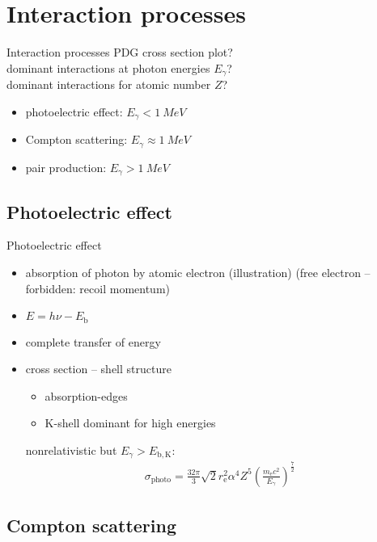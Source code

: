 \documentclass[11pt,xcolor=dvipsnames,professionalfonts]{beamer}
\begin{document}
\section{Interaction processes}

\begin{frame}{Interaction processes}
	PDG cross section plot?\\
	dominant interactions at photon energies $E_\gamma$?\\
	dominant interactions for atomic number $Z$?
	\begin{itemize}
		\item photoelectric effect: $E_\gamma < \SI{1}{MeV}$
		\item Compton scattering: $E_\gamma \approx \SI{1}{MeV}$
		\item pair production: $E_\gamma > \SI{1}{MeV}$
	\end{itemize}
\end{frame}

\subsection{Photoelectric effect}

\begin{frame}{Photoelectric effect}
	\begin{itemize}
		\item absorption of photon by atomic electron (illustration) (free electron -- forbidden: recoil momentum)
		\item $E = h \nu - E_\mathrm{b}$
		\item complete transfer of energy
		\item cross section -- shell structure
		\begin{itemize}
			\item absorption-edges
			\item K-shell dominant for high energies
		\end{itemize}
		nonrelativistic but $E_\gamma > E_\mathrm{b, K}$:
		\begin{align*}
			\sigma_\mathrm{photo} = \frac{32 \pi}{3} \sqrt{2} r_\mathrm{e}^2  \alpha^4  Z^5 \left( \frac{m_\mathrm{e} c^2}{E_\gamma}\right)^\frac{7}{2} 
		\end{align*}		
	\end{itemize}
\end{frame}


\subsection{Compton scattering}
\end{document}
